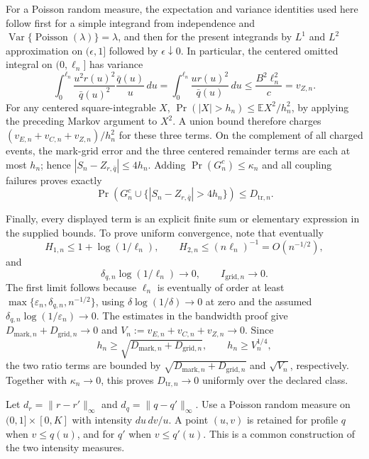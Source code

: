 For a Poisson random measure, the expectation and variance identities used here follow first for a simple integrand from independence and
\(\operatorname{Var}\{\operatorname{Poisson}(\lambda)\}=\lambda\), and then for the present integrands by \(L^1\) and \(L^2\) approximation on \((\epsilon,1]\) followed by \(\epsilon\downarrow0\).  In particular, the centered omitted integral on \((0,\ell_n]\) has variance
\[
 \int_0^{\ell_n}\frac{u^2r(u)^2}{\bar q(u)^2}
                 \frac{\bar q(u)}u\,du
 =\int_0^{\ell_n}\frac{u r(u)^2}{\bar q(u)}\,du
 \leq \frac{B^2\ell_n^2}{c}=v_{Z,n}.
\]
For any centered square-integrable \(X\),
\(\Pr(|X|>h_n)\leq\mathbb EX^2/h_n^2\), by applying the preceding Markov argument to \(X^2\).  A union bound therefore charges
\((v_{E,n}+v_{C,n}+v_{Z,n})/h_n^2\) for these three terms.  On the complement of all charged events, the mark-grid error and the three centered remainder terms are each at most \(h_n\); hence
\(|S_n-Z_{r,\bar q}|\leq4h_n\).  Adding \(\Pr(G_n^c)\leq\kappa_n\) and all coupling failures proves exactly
\[
 \Pr\!\left(G_n^c\cup\{|S_n-Z_{r,\bar q}|>4h_n\}\right)
 \leq D_{\mathrm{tr},n}.
\]

Finally, every displayed term is an explicit finite sum or elementary expression in the supplied bounds.  To prove uniform convergence, note that eventually
\[
 H_{1,n}\leq1+\log(1/\ell_n),\qquad
 H_{2,n}\leq(n\ell_n)^{-1}=O(n^{-1/2}),
\]
and
\[
 \delta_{q,n}\log(1/\ell_n)\to0,\qquad
 I_{\mathrm{grid},n}\to0.
\]
The first limit follows because \(\ell_n\) is eventually of order at least
\(\max\{\varepsilon_n,\delta_{q,n},n^{-1/2}\}\), using
\(\delta\log(1/\delta)\to0\) at zero and the assumed
\(\delta_{q,n}\log(1/\varepsilon_n)\to0\).
The estimates in the bandwidth proof give
\(D_{\mathrm{mark},n}+D_{\mathrm{grid},n}\to0\) and
\(V_n:=v_{E,n}+v_{C,n}+v_{Z,n}\to0\).  Since
\[
 h_n\geq\sqrt{D_{\mathrm{mark},n}+D_{\mathrm{grid},n}},
 \qquad h_n\geq V_n^{1/4},
\]
the two ratio terms are bounded by
\(\sqrt{D_{\mathrm{mark},n}+D_{\mathrm{grid},n}}\) and
\(\sqrt{V_n}\), respectively.  Together with \(\kappa_n\to0\), this proves
\(D_{\mathrm{tr},n}\to0\) uniformly over the declared class.

Let \(d_r=\|r-r'\|_\infty\) and \(d_q=\|q-q'\|_\infty\).
Use a Poisson random measure on
\((0,1]\times[0,K]\) with intensity \(du\,dv/u\).  A point \((u,v)\) is retained for profile \(q\) when \(v\leq q(u)\), and for \(q'\) when \(v\leq q'(u)\).  This is a common construction of the two intensity measures.

